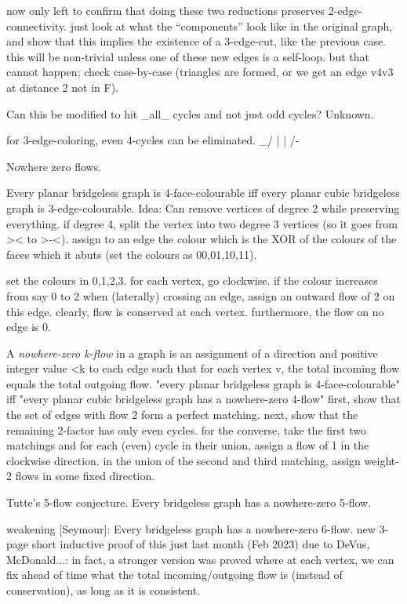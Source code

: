 now only left to confirm that doing these two reductions preserves 2-edge-connectivity. just look at what the ``components'' look like in the original graph, and show that this implies the existence of a 3-edge-cut, like the previous case. this will be non-trivial unless one of these new edges is a self-loop. but that cannot happen; check case-by-case (triangles are formed, or we get an edge v4v3 at distance 2 not in F).

Can this be modified to hit _all_ cycles and not just odd cycles? Unknown.

for 3-edge-coloring, even 4-cycles can be eliminated.
\_/
| |
/-\



Nowhere zero flows.

Every planar bridgeless graph is 4-face-colourable iff every planar cubic bridgeless graph is 3-edge-colourable.
Idea: Can remove vertices of degree 2 while preserving everything. if degree 4, split the vertex into two degree 3 vertices (so it goes from >< to >-<).
assign to an edge the colour which is the XOR of the colours of the faces which it abuts (set the colours as 00,01,10,11).

set the colours in {0,1,2,3}. for each vertex, go clockwise. if the colour increases from say 0 to 2 when (laterally) crossing an edge, assign an outward flow of 2 on this edge. clearly, flow is conserved at each vertex. furthermore, the flow on no edge is 0.

A \emph{nowhere-zero k-flow} in a graph is an assignment of a direction and positive integer value <k to each edge such that for each vertex v, the total incoming flow equals the total outgoing flow.
"every planar bridgeless graph is 4-face-colourable" iff "every planar cubic bridgeless graph has a nowhere-zero 4-flow"
first, show that the set of edges with flow 2 form a perfect matching. next, show that the remaining 2-factor has only even cycles.
for the converse, take the first two matchings and for each (even) cycle in their union, assign a flow of 1 in the clockwise direction. in the union of the second and third matching, assign weight-2 flows in some fixed direction.



Tutte's 5-flow conjecture.
Every bridgeless graph has a nowhere-zero 5-flow.

weakening [Seymour]: Every bridgeless graph has a nowhere-zero 6-flow.
new 3-page short inductive proof of this just last month (Feb 2023) due to DeVus, McDonald...: in fact, a stronger version was proved where at each vertex, we can fix ahead of time what the total incoming/outgoing flow is (instead of conservation), as long as it is consistent.

